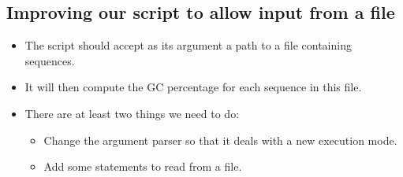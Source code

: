 \documentclass[aspectratio=1610,slidestop]{beamer}
\begin{document}
\subsection{Improving our script to allow input from a file}
\begin{pframe}
 \begin{itemize}
  \item The script should accept as its argument a path to a file containing
  sequences.
  \item It will then compute the GC percentage for each sequence in this file.
  \item There are at least two things we need to do:
  \begin{itemize}
   \item Change the argument parser so that it deals with a new execution mode.
   \item Add some statements to read from a file.
  \end{itemize}
 \end{itemize}
\end{pframe}

\end{document}
